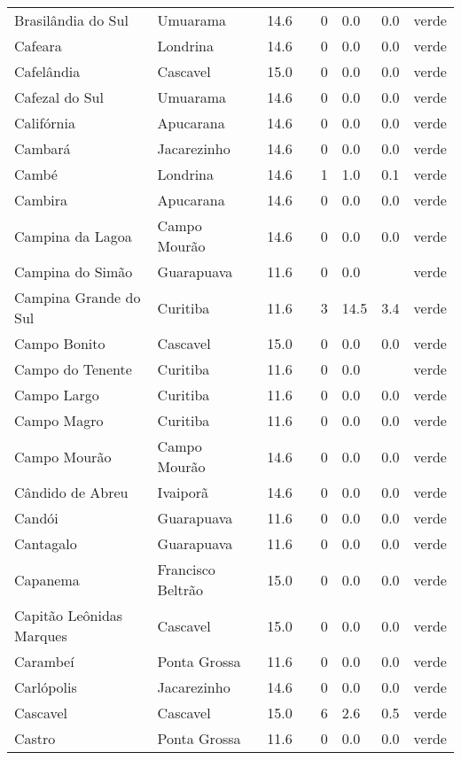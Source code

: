 \begin{longtable}{l|lllllll}
  Brasilândia do Sul & Umuarama & 14.6 &  & 0 & 0.0 & 0.0 & verde \\ 
  Cafeara & Londrina & 14.6 &  & 0 & 0.0 & 0.0 & verde \\ 
  Cafelândia & Cascavel & 15.0 &  & 0 & 0.0 & 0.0 & verde \\ 
  Cafezal do Sul & Umuarama & 14.6 &  & 0 & 0.0 & 0.0 & verde \\ 
  Califórnia & Apucarana & 14.6 &  & 0 & 0.0 & 0.0 & verde \\ 
  Cambará & Jacarezinho & 14.6 &  & 0 & 0.0 & 0.0 & verde \\ 
  Cambé & Londrina & 14.6 &  & 1 & 1.0 & 0.1 & verde \\ 
  Cambira & Apucarana & 14.6 &  & 0 & 0.0 & 0.0 & verde \\ 
  Campina da Lagoa & Campo Mourão & 14.6 &  & 0 & 0.0 & 0.0 & verde \\ 
  Campina do Simão & Guarapuava & 11.6 &  & 0 & 0.0 &  & verde \\ 
  Campina Grande do Sul & Curitiba & 11.6 &  & 3 & 14.5 & 3.4 & verde \\ 
  Campo Bonito & Cascavel & 15.0 &  & 0 & 0.0 & 0.0 & verde \\ 
  Campo do Tenente & Curitiba & 11.6 &  & 0 & 0.0 &  & verde \\ 
  Campo Largo & Curitiba & 11.6 &  & 0 & 0.0 & 0.0 & verde \\ 
  Campo Magro & Curitiba & 11.6 &  & 0 & 0.0 & 0.0 & verde \\ 
  Campo Mourão & Campo Mourão & 14.6 &  & 0 & 0.0 & 0.0 & verde \\ 
  Cândido de Abreu & Ivaiporã & 14.6 &  & 0 & 0.0 & 0.0 & verde \\ 
  Candói & Guarapuava & 11.6 &  & 0 & 0.0 & 0.0 & verde \\ 
  Cantagalo & Guarapuava & 11.6 &  & 0 & 0.0 & 0.0 & verde \\ 
  Capanema & Francisco Beltrão & 15.0 &  & 0 & 0.0 & 0.0 & verde \\ 
  Capitão Leônidas Marques & Cascavel & 15.0 &  & 0 & 0.0 & 0.0 & verde \\ 
  Carambeí & Ponta Grossa & 11.6 &  & 0 & 0.0 & 0.0 & verde \\ 
  Carlópolis & Jacarezinho & 14.6 &  & 0 & 0.0 & 0.0 & verde \\ 
  Cascavel & Cascavel & 15.0 &  & 6 & 2.6 & 0.5 & verde \\ 
  Castro & Ponta Grossa & 11.6 &  & 0 & 0.0 & 0.0 & verde \\ 

\end{longtable}

